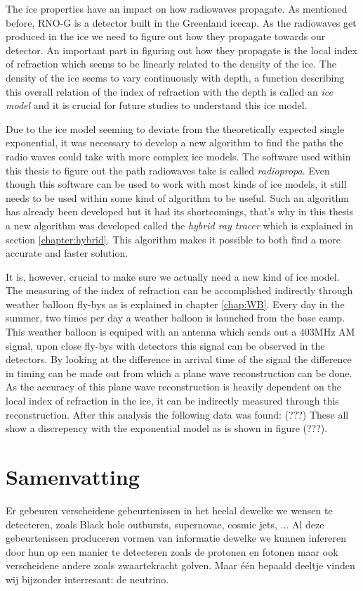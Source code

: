 \documentclass[11pt,a4paper,faculty=we,language=en,doctype=report]{cls/ugent-doc}
\begin{document}
The ice properties have an impact on how radiowaves propagate. As mentioned before, RNO-G is a detector built
in the Greenland icecap. As the radiowaves get produced in the ice we need to figure out how
they propagate towards our detector. An important part in figuring out how they propagate is 
the local index of refraction which seems to be linearly related to the density of the ice. 
The density of the ice seems to vary continuously with depth, a function describing
this overall relation of the index of refraction with the depth is called an \textit{ice model}
and it is crucial for future studies to understand this ice model.

Due to the ice model seeming to deviate from the theoretically expected single exponential, it was necessary to 
develop a new algorithm to find the paths the radio waves could take with more complex ice models. 
The software used within this thesis to figure out the path radiowaves take is called \textit{radiopropa}.
Even though this software can be used to work with most kinds of ice models, it still needs to be used within
some kind of algorithm to be useful. Such an algorithm has already been developed but it had its shortcomings,
that's why in this thesis a new algorithm was developed called the \textit{hybrid ray tracer} which is explained
in section \ref{chapter:hybrid}. This algorithm makes it possible to both find a more accurate and faster solution.

It is, however, crucial to make sure we actually need a new kind of ice model. The measuring of the index of refraction
can be accomplished indirectly through weather balloon fly-bys as is explained in chapter \ref{chap:WB}. Every day
in the summer, two times per day a weather balloon is launched from the base camp. This weather balloon is equiped with
an antenna which sends out a 403MHz AM signal, upon close fly-bys with detectors this signal can be observed in the
detectors. By looking at the difference in arrival time of the signal the difference in timing can be made out from 
which a plane wave reconstruction can be done. As the accuracy of this plane wave reconstruction is heavily dependent
on the local index of refraction in the ice, it can be indirectly measured through this reconstruction.
After this analysis the following data was found:
(???)
These all show a discrepency with the exponential model as is shown in figure (???). 

\newpage
\chapter*{Samenvatting}
Er gebeuren verscheidene gebeurtenissen in het heelal dewelke we wensen
te detecteren, zoals Black hole outbursts, supernovae, cosmic jets, ...
Al deze gebeurtenissen produceren vormen van informatie dewelke we kunnen
infereren door hun op een manier te detecteren zoals de protonen en fotonen
maar ook verscheidene andere zoals zwaartekracht golven.
Maar één bepaald deeltje vinden wij bijzonder interresant: de neutrino.
\end{document}
